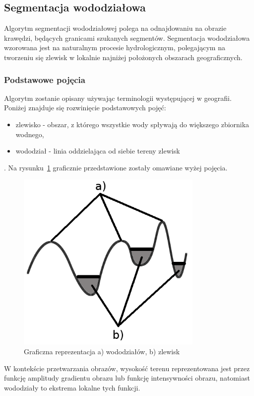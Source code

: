 \subsection{Segmentacja wododziałowa}
Algorytm segmentacji wododziałowej polega na odnajdowaniu na obrazie krawędzi, będących granicami szukanych segmentów. Segmentacja wododziałowa wzorowana jest na naturalnym procesie hydrologicznym, polegającym na tworzeniu się zlewisk w lokalnie najniżej położonych obszarach geograficznych. \\
\subsubsection{Podstawowe pojęcia}
Algorytm zostanie opisany używając terminologii występującej w geografii. Poniżej znajduje się rozwinięcie podstawowych pojęć:
\begin{itemize}
  \item zlewisko - obszar, z którego wszystkie wody spływają do większego zbiornika wodnego,
  \item wododział - linia oddzielająca od siebie tereny zlewisk
\end{itemize}. Na rysunku~\ref{fig:watershed_graphic} graficznie przedstawione zostały omawiane wyżej pojęcia.
\begin{figure}
  \centering
  \includegraphics[width=9cm]{img/watershed-graphic}
  \caption{Graficzna reprezentacja a) wododziałów, b) zlewisk }
  \label{fig:watershed_graphic}
\end{figure}
W kontekście przetwarzania obrazów, wysokość terenu reprezentowana jest przez funkcję amplitudy gradientu obrazu lub funkcję intensywności obrazu, natomiast wododziały to ekstrema lokalne tych funkcji.
